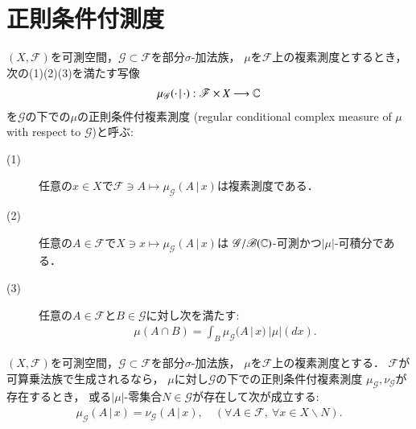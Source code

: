 \section{正則条件付測度}
	\begin{screen}
		\begin{dfn}[正則条件付複素測度]
			$(X,\mathscr{F})$を可測空間，$\mathscr{G} \subset \mathscr{F}$を部分$\sigma$-加法族，
			$\mu$を$\mathscr{F}$上の複素測度とするとき，次の(1)(2)(3)を満たす写像
			\begin{align}
				\mu_{\mathscr{G}}(\cdot\, |\, \cdot):\mathscr{F} \times X \longrightarrow \mathbb{C}
			\end{align}
			を$\mathscr{G}$の下での$\mu$の正則条件付複素測度
			(regular conditional complex measure of $\mu$ with respect to $\mathscr{G}$)と呼ぶ:
			\begin{description}
				\item[(1)] 任意の$x \in X$で$\mathscr{F} \ni A \longmapsto \mu_{\mathscr{G}}(A\, |\, x)$は複素測度である．
				\item[(2)] 任意の$A \in \mathscr{F}$で$X \ni x \longmapsto \mu_{\mathscr{G}}(A\, |\, x)$は
					$\mathscr{G}/\mathscr{B}(\mathbb{C})$-可測かつ$|\mu|$-可積分である．
				\item[(3)] 任意の$A \in \mathscr{F}$と$B \in \mathscr{G}$に対し次を満たす:
					\begin{align}
						\mu(A \cap B) = \int_B \mu_{\mathscr{G}}(A\, |\, x)\ |\mu|(dx).
					\end{align}
			\end{description}
		\end{dfn}
	\end{screen}
	
	\begin{screen}
		\begin{thm}[正則条件付複素測度の一意性]
			$(X,\mathscr{F})$を可測空間，$\mathscr{G} \subset \mathscr{F}$を部分$\sigma$-加法族，
			$\mu$を$\mathscr{F}$上の複素測度とする．
			$\mathscr{F}$が可算乗法族で生成されるなら，
			$\mu$に対し$\mathscr{G}$の下での正則条件付複素測度
			$\mu_{\mathscr{G}},\nu_{\mathscr{G}}$が存在するとき，
			或る$|\mu|$-零集合$N \in \mathscr{G}$が存在して次が成立する:
			\begin{align}
				\mu_{\mathscr{G}}(A\, |\, x) = \nu_{\mathscr{G}}(A\, |\, x),
				\quad (\forall A \in \mathscr{F},\ \forall x \in X \backslash N).
			\end{align}
		\end{thm}
	\end{screen}
	
